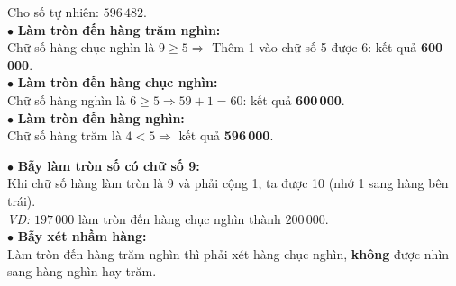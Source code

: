 \documentclass[14pt,a4paper,oneside]{extbook}
\begin{document}
\vspace{2mm}

\noindent
\begin{minipage}[t]{0.53\textwidth}
  \begin{tcolorbox}[
    enhanced,
    title={\footnotesize\bfseries\color{white}\faCheckCircle\ Ví dụ thực hành chuẩn mực},
    colback=green!2!white,
    colframe=green!60!black,
    arc=2.5mm, boxrule=0.8pt, top=1.8mm, bottom=1.8mm, left=2.2mm, right=2.2mm
  ]
    \footnotesize
    Cho số tự nhiên: $596\,482$.\\
    $\bullet$ \textbf{Làm tròn đến hàng trăm nghìn:}\\
    Chữ số hàng chục nghìn là $9 \ge 5 \Rightarrow$ Thêm 1 vào chữ số 5 được 6: kết quả \textbf{600\,000}.\\
    $\bullet$ \textbf{Làm tròn đến hàng chục nghìn:}\\
    Chữ số hàng nghìn là $6 \ge 5 \Rightarrow 59 + 1 = 60$: kết quả \textbf{600\,000}.\\
    $\bullet$ \textbf{Làm tròn đến hàng nghìn:}\\
    Chữ số hàng trăm là $4 < 5 \Rightarrow$ kết quả \textbf{596\,000}.
  \end{tcolorbox}
\end{minipage}%
\hfill
\begin{minipage}[t]{0.45\textwidth}
  \begin{tcolorbox}[
    enhanced,
    title={\footnotesize\bfseries\color{white}\faExclamationTriangle\ Mẹo tránh bẫy trắc nghiệm},
    colback=red!2!white,
    colframe=red!70!black,
    arc=2.5mm, boxrule=0.8pt, top=1.8mm, bottom=1.8mm, left=2.2mm, right=2.2mm
  ]
    \footnotesize
    $\bullet$ \textbf{Bẫy làm tròn số có chữ số 9:}\\
    Khi chữ số hàng làm tròn là 9 và phải cộng 1, ta được 10 (nhớ 1 sang hàng bên trái).\\
    \textit{VD:} $197\,000$ làm tròn đến hàng chục nghìn thành $200\,000$.\\
    $\bullet$ \textbf{Bẫy xét nhầm hàng:}\\
    Làm tròn đến hàng trăm nghìn thì phải xét hàng chục nghìn, \textbf{không} được nhìn sang hàng nghìn hay trăm.
  \end{tcolorbox}
\end{minipage}
\end{document}
